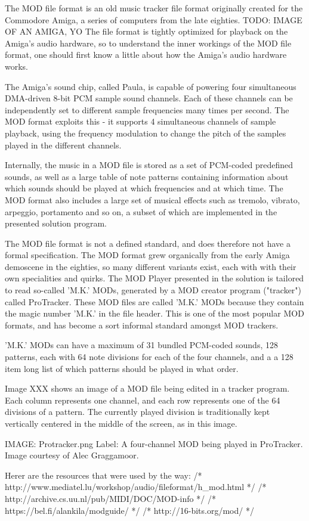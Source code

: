 
The MOD file format is an old music tracker file format originally created for the Commodore Amiga, a series of computers from the late eighties. TODO: IMAGE OF AN AMIGA, YO
The file format is tightly optimized for playback on the Amiga's audio hardware, so to understand the inner workings of the MOD file format, one should first know a little about how the Amiga's audio hardware works.

The Amiga's sound chip, called Paula, is capable of powering four simultaneous DMA-driven 8-bit PCM sample sound channels.
Each of these channels can be independently set to different sample frequencies many times per second.
The MOD format exploits this - it supports 4 simultaneous channels of sample playback, using the frequency modulation to change the pitch of the samples played in the different channels.

Internally, the music in a MOD file is stored as a set of PCM-coded predefined sounds, as well as a large table of note patterns containing information about which sounds should be played at which frequencies and at which time.
The MOD format also includes a large set of musical effects such as tremolo, vibrato, arpeggio, portamento and so on, a subset of which are implemented in the presented solution program.

The MOD file format is not a defined standard, and does therefore not have a formal specification.
The MOD format grew organically from the early Amiga demoscene in the eighties, so many different variants exist, each with with their own specialities and quirks.
The MOD Player presented in the solution is tailored to read so-called 'M.K.' MODs, generated by a MOD creator program ("tracker") called ProTracker.
These MOD files are called 'M.K.' MODs because they contain the magic number 'M.K.' in the file header.
This is one of the most popular MOD formats, and has become a sort informal standard amongst MOD trackers.

'M.K.' MODs can have a maximum of 31 bundled PCM-coded sounds, 128 patterns, each with 64 note divisions for each of the four channels, and a a 128 item long list of which patterns should be played in what order.

Image XXX shows an image of a MOD file being edited in a tracker program.
Each column represents one channel, and each row represents one of the 64 divisions of a pattern.
The currently played division is traditionally kept vertically centered in the middle of the screen, as in this image.




IMAGE: Protracker.png
Label: A four-channel MOD being played in ProTracker. Image courtesy of Alec Graggamoor.


Herer are the resources that were used by the way:
/* http://www.mediatel.lu/workshop/audio/fileformat/h_mod.html */
/* http://archive.cs.uu.nl/pub/MIDI/DOC/MOD-info */
/* https://bel.fi/alankila/modguide/ */
/* http://16-bits.org/mod/ */
